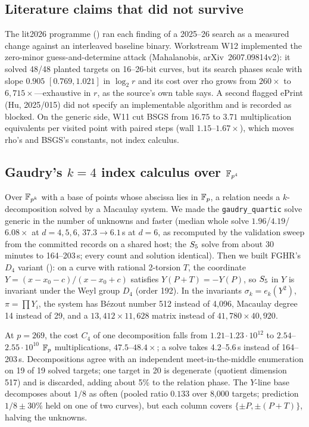 \subsection{Literature claims that did not survive}

The lit2026 programme () ran each
finding of a 2025--26 search as a measured change against an interleaved
baseline binary. Workstream W12 implemented the zero-minor
guess-and-determine attack (Mahalanobis, arXiv~2607.09814v2): it solved
48/48 planted targets on 16--26-bit curves, but its search phases scale
with slope $0.905$ $[0.769,1.021]$ in $\log_2 r$ and its cost over rho
grows from $260\times$ to $6{,}715\times$---exhaustive in $r$, as the
source's own table says. A second flagged ePrint (Hu, 2025/015) did not
specify an implementable algorithm and is recorded as blocked. On the
generic side, W11 cut BSGS from $16.75$ to $3.71$ multiplication
equivalents per visited point with paired steps (wall $1.15$--$1.67\times$),
which moves rho's and BSGS's constants, not index calculus.

\subsection{Gaudry's $k=4$ index calculus over $\mathbb{F}_{p^4}$}\label{sec:gaudry}

Over $\mathbb{F}_{p^k}$ with a base of points whose abscissa lies in $\mathbb{F}_p$, a
relation needs a $k$-decomposition solved by a Macaulay system. We made the
\texttt{gaudry\_quartic} solve generic in the number of unknowns and faster
(median whole solve $1.96$/$4.19$/$6.08\times$ at $d=4,5,6$, $37.3\to6.1$\,s
at $d=6$, as recomputed by the validation sweep from the committed records
on a shared host; the $S_{5}$ solve from about 30 minutes to 164--203\,s;
every count and solution identical). Then we built FGHR's $D_4$ variant
(): on a curve with rational
2-torsion $T$, the coordinate $Y=(x-x_0-c)/(x-x_0+c)$ satisfies
$Y(P+T)=-Y(P)$, so $S_{5}$ in $Y$ is invariant under the Weyl group $D_4$
(order 192). In the invariants $\sigma_k=e_k(Y^2)$, $\pi=\prod Y_i$, the
system has B\'ezout number 512 instead of 4{,}096, Macaulay degree 14
instead of 29, and a $13{,}412\times11{,}628$ matrix instead of
$41{,}780\times40{,}920$.

At $p=269$, the cost $C_4$ of one decomposition falls from
$1.21$--$1.23\cdot10^{12}$ to $2.54$--$2.55\cdot10^{10}$ $\mathbb{F}_p$
multiplications, $47.5$--$48.4\times$; a solve takes 4.2--5.6\,s instead of
164--203\,s. Decompositions agree with an independent meet-in-the-middle
enumeration on 19 of 19 solved targets; one target in 20 is degenerate
(quotient dimension 517) and is discarded, adding about 5\% to the
relation phase. The $Y$-line base decomposes about $1/8$ as often (pooled
ratio $0.133$ over 8{,}000 targets; prediction $1/8\pm30\%$ held on one of
two curves), but each column covers $\{\pm P,\pm(P+T)\}$, halving the
unknowns.

